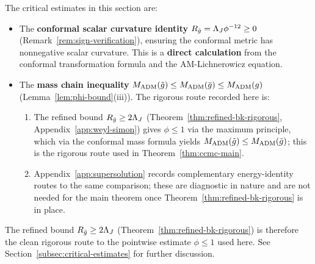 \begin{remark}\label{rem:verification-lich}
The critical estimates in this section are:
\begin{itemize}
    \item The \textbf{conformal scalar curvature identity} $R_{\tilde{g}} = \Lambda_J \phi^{-12} \geq 0$ (Remark~\ref{rem:sign-verification}), ensuring the conformal metric has nonnegative scalar curvature. This is a \textbf{direct calculation} from the conformal transformation formula and the AM-Lichnerowicz equation.
    \item The \textbf{mass chain inequality} $M_{\mathrm{ADM}}(\tilde{g}) \leq M_{\mathrm{ADM}}(\bar{g}) \leq M_{\mathrm{ADM}}(g)$ (Lemma~\ref{lem:phi-bound}(iii)). The rigorous route recorded here is:
    \begin{enumerate}[label=(\alph*)]
    \item The refined bound $R_{\bar{g}} \geq 2\Lambda_J$ (Theorem~\ref{thm:refined-bk-rigorous}, Appendix~\ref{app:weyl-simon}) gives $\phi \leq 1$ via the maximum principle, which via the conformal mass formula yields $M_{\mathrm{ADM}}(\tilde{g}) \leq M_{\mathrm{ADM}}(\bar{g})$; this is the rigorous route used in Theorem~\ref{thm:ccmc-main}.
    \item Appendix~\ref{app:supersolution} records complementary energy-identity routes to the same comparison; these are diagnostic in nature and are not needed for the main theorem once Theorem~\ref{thm:refined-bk-rigorous} is in place.
    \end{enumerate}
\end{itemize}
The refined bound $R_{\bar{g}} \geq 2\Lambda_J$ (Theorem~\ref{thm:refined-bk-rigorous}) is therefore the clean rigorous route to the pointwise estimate $\phi \leq 1$ used here. See Section~\ref{subsec:critical-estimates} for further discussion.
\end{remark}
